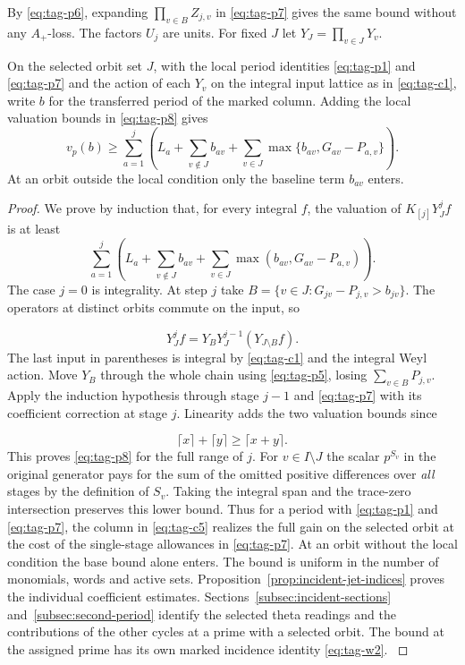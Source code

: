 By \eqref{eq:tag-p6}, expanding \(\prod_{v\in B}Z_{j,v}\) in \eqref{eq:tag-p7} gives the
same bound without any \(A_+\)-loss. The factors \(U_j\) are units.
For fixed \(J\) let \(Y_J=\prod_{v\in J}Y_v\).
\begin{proposition}\label{prop:period-stage-prices}
On the selected orbit set \(J\), with the local period identities
\eqref{eq:tag-p1} and \eqref{eq:tag-p7} and the action of each \(Y_v\) on the integral input lattice as in \eqref{eq:tag-c1}, write \(b\) for the transferred period of the marked column. Adding the local valuation bounds in \eqref{eq:tag-p8} gives
\[
 v_p(b)\ge\sum_{a=1}^j\left(L_a+\sum_{v\notin J}b_{av}+\sum_{v\in J}\max\{b_{av},G_{av}-P_{a,v}\}\right).
\]
 At an orbit outside the local condition only the baseline term \(b_{av}\) enters.
\end{proposition}

\begin{proof}
We prove by induction that, for every integral \(f\), the valuation of \(K_{[j]}Y_J^j f\) is at least
\[
 \sum_{a=1}^j\left(
 L_a+\sum_{v\notin J}b_{av}
     +\sum_{v\in J}\max(b_{av},G_{av}-P_{a,v})\right).
 \tag{P8}\label{eq:tag-p8}
\]
The case \(j=0\) is integrality. At step \(j\) take
\(B=\{v\in J:G_{jv}-P_{j,v}> b_{jv}\}\).
The operators at distinct orbits commute on the input, so

\[
  Y_J^j f=Y_B Y_J^{j-1}(Y_{J\setminus B}f).
\]
 The last input
in parentheses is integral by \eqref{eq:tag-c1} and the integral Weyl action.
Move \(Y_B\) through the whole chain using \eqref{eq:tag-p5}, losing
\(\sum_{v\in B}P_{j,v}\). Apply the induction hypothesis
through stage \(j-1\) and \eqref{eq:tag-p7} with its coefficient correction
at stage \(j\). Linearity adds the two valuation bounds since

\[
  \lceil x\rceil+\lceil y\rceil\ge\lceil x+y\rceil.
\]
This proves \eqref{eq:tag-p8} for the full range of \(j\).
For \(v\in I\setminus J\) the scalar \(p^{S_v}\) in the original
generator pays for the sum of the omitted positive differences
over \emph{all} stages by the definition of \(S_v\).
Taking the integral span and the trace-zero intersection
preserves this lower bound. Thus for a period with \eqref{eq:tag-p1} and \eqref{eq:tag-p7},
the column in \eqref{eq:tag-c5} realizes the full gain on the selected orbit at the cost of
the single-stage allowances in \eqref{eq:tag-p7}. At an orbit without the local condition the
base bound alone enters. The bound is uniform in the number of
monomials, words and active sets. Proposition~\ref{prop:incident-jet-indices}
proves the individual coefficient estimates. Sections~\ref{subsec:incident-sections}
and~\ref{subsec:second-period} identify the selected theta
readings and the contributions of the other cycles at a prime with a selected orbit. The bound at the assigned prime has its own marked incidence
identity \eqref{eq:tag-w2}. \label{cor:hecke-period-1}
\end{proof}

